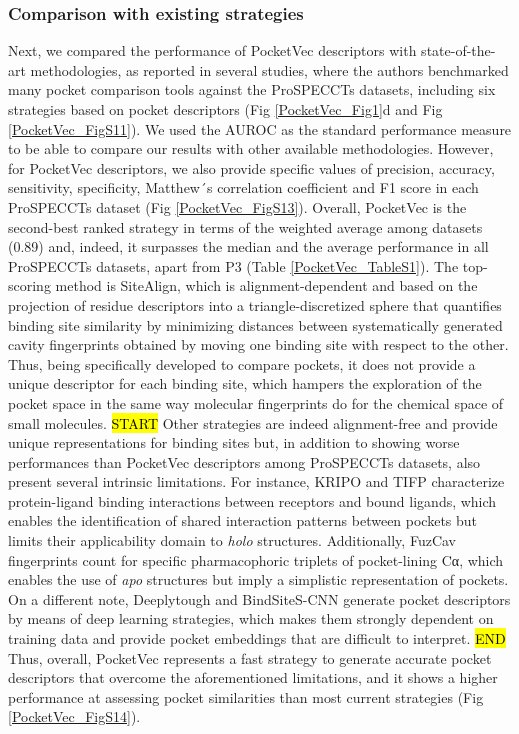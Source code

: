 \subsubsection{Comparison with existing strategies}
\label{PocketVec_ResultsAndDiscussion_Comparison_with_existing_strategies}

Next, we compared the performance of PocketVec descriptors with state-of-the-art methodologies, as reported in several studies\cite{simonovsky_deeplytough_2020, scott_classification_2022, ehrt_benchmark_2018}, where the authors benchmarked many pocket comparison tools against the ProSPECCTs datasets, including six strategies based on pocket descriptors (Fig \ref{PocketVec_Fig1}d and Fig \ref{PocketVec_FigS11}). We used the AUROC as the standard performance measure to be able to compare our results with other available methodologies. However, for PocketVec descriptors, we also provide specific values of precision, accuracy, sensitivity, specificity, Matthew´s correlation coefficient and F1 score in each ProSPECCTs dataset (Fig \ref{PocketVec_FigS13}). Overall, PocketVec is the second-best ranked strategy in terms of the weighted average among datasets (0.89) and, indeed, it surpasses the median and the average performance in all ProSPECCTs datasets, apart from P3 (Table \ref{PocketVec_TableS1}). The top-scoring method is SiteAlign\cite{schalon_simple_2008}, which is alignment-dependent and based on the projection of residue descriptors into a triangle-discretized sphere that quantifies binding site similarity by minimizing distances between systematically generated cavity fingerprints obtained by moving one binding site with respect to the other. Thus, being specifically developed to compare pockets, it does not provide a unique descriptor for each binding site, which hampers the exploration of the pocket space in the same way molecular fingerprints do for the chemical space of small molecules. \hl{START} Other strategies are indeed alignment-free and provide unique representations for binding sites but, in addition to showing worse performances than PocketVec descriptors among ProSPECCTs datasets, also present several intrinsic limitations. For instance, KRIPO\cite{wood_pharmacophore_2012} and TIFP\cite{desaphy_encoding_2013} characterize protein-ligand binding interactions between receptors and bound ligands, which enables the identification of shared interaction patterns between pockets but limits their applicability domain to \textit{holo} structures. Additionally, FuzCav\cite{weill_alignment-free_2010} fingerprints count for specific pharmacophoric triplets of pocket-lining Cα, which enables the use of \textit{apo} structures but imply a simplistic representation of pockets. On a different note, Deeplytough\cite{simonovsky_deeplytough_2020} and BindSiteS-CNN\cite{scott_classification_2022} generate pocket descriptors by means of deep learning strategies, which makes them strongly dependent on training data and provide pocket embeddings that are difficult to interpret. \hl{END} Thus, overall, PocketVec represents a fast strategy to generate accurate pocket descriptors that overcome the aforementioned limitations, and it shows a higher performance at assessing pocket similarities than most current strategies (Fig \ref{PocketVec_FigS14}).
